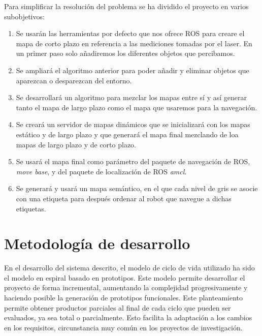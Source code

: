 Para simplificar la resolución del problema se ha dividido el proyecto en varios subobjetivos:

\begin{enumerate}
\item Se usarán las herramientas por defecto que nos ofrece ROS para creare el mapa de corto plazo en referencia a las mediciones tomadas por el laser. En un primer paso solo añadiremos los diferentes objetos que percibamos.
\item Se ampliará el algoritmo anterior para poder añadir y eliminar objetos que aparezcan o desparezcan del entorno. 
\item Se desarrollará un algoritmo para mezclar los mapas entre sí y así generar tanto el mapa de largo plazo como el mapa que usaremos para la navegación.
\item Se creará un servidor de mapas dinámicos que se inicializará con los mapas estático y de largo plazo y que generará el mapa final mezclando de loa mapas de largo plazo y de corto plazo.
\item Se usará el mapa final como parámetro del paquete de navegación de ROS, \textit{move base}, y del paquete de localización de ROS \textit{amcl}.
\item Se generará y usará un mapa semántico, en el que cada nivel de gris se asocie con una etiqueta para después ordenar al robot que navegue a dichas etiquetas.
\end{enumerate}

\section{Metodología de desarrollo}
\label{sec:metodologiadedesarrollo}

En el desarrollo del sistema descrito, el modelo de ciclo de vida utilizado ha sido el modelo en espiral basado en prototipos. Este modelo permite desarrollar el proyecto de forma incremental, aumentando la complejidad progresivamente y haciendo posible la generación de prototipos funcionales. Este planteamiento permite obtener productos parciales al final de cada ciclo que pueden ser evaluados, ya sea total o parcialmente. Esto facilita la adaptación a los cambios en los requisitos, circunstancia muy común en los proyectos de investigación.\\

